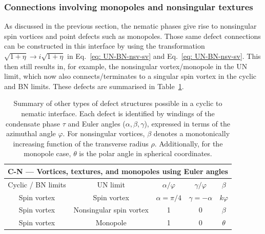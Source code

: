 \subsubsection{Connections involving monopoles and nonsingular textures}
As discussed in the previous section, the nematic phases give rise to
nonsingular spin vortices and point defects such as monopoles.
Those same defect connections can be constructed in this interface by using
the transformation \(\sqrt{1+\eta} \rightarrow i\sqrt{1+\eta}\) in
Eq.~\eqref{eq: UN-BN-nsv-sv} and Eq.~\eqref{eq: UN-BN-nsv-sv}.
This then still results in, for example, the nonsingular vortex/monopole in the
UN limit, which now also connects/terminates to a singular spin vortex in the
cyclic and BN limits.
These defects are summarised in Table~\ref{tab: C-N-other}.
\begin{table}
    \centering
    \begin{tabular}{ccccc}
        \toprule
        \multicolumn{5}{c}{C-N --- Vortices, textures, and monopoles using Euler
            angles} \\
        \midrule
        Cyclic / BN limits & UN limit & \(\alpha/\varphi \)
        & \(\gamma/\varphi \) & \(\beta \) \\
        \midrule
        Spin vortex & Spin vortex & \(\alpha=\pi/4\)
            & \(\gamma=-\alpha\) & \(k\varphi\) \\
        Spin vortex & Nonsingular spin vortex & 1 & 0
            & \(\beta\) \\
        Spin vortex & Monopole & 1 & 0 & \(\theta\) \\
        \bottomrule
    \end{tabular}
    \caption[Examples of monopole and nonsingular vortex connections across a
    cyclic to nematic interface]{\label{tab: C-N-other}Summary of other types of
    defect structures possible in a cyclic to nematic interface.
    Each defect is identified by windings of the condensate phase \(\tau \) and
    Euler angles (\(\alpha, \beta, \gamma \)), expressed in terms of the
    azimuthal angle \(\varphi \).
    For nonsingular vortices, \(\beta\) denotes a monotonically increasing
    function of the transverse radius \(\rho \).
    Additionally, for the monopole case, \(\theta \) is the polar angle in
    spherical coordinates.}
\end{table}

